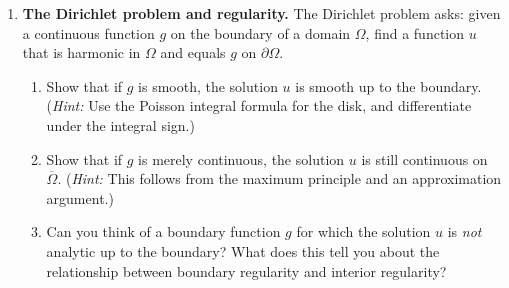 \begin{enumerate}
    \item[$\star$] \textbf{The Dirichlet problem and regularity.} The Dirichlet problem asks: given a continuous function $g$ on the boundary of a domain $\Omega$, find a function $u$ that is harmonic in $\Omega$ and equals $g$ on $\partial \Omega$.
    \begin{enumerate}
        \item Show that if $g$ is smooth, the solution $u$ is smooth up to the boundary. (\emph{Hint:} Use the Poisson integral formula for the disk, and differentiate under the integral sign.)
        \item Show that if $g$ is merely continuous, the solution $u$ is still continuous on $\overline{\Omega}$. (\emph{Hint:} This follows from the maximum principle and an approximation argument.)
        \item Can you think of a boundary function $g$ for which the solution $u$ is \emph{not} analytic up to the boundary? What does this tell you about the relationship between boundary regularity and interior regularity?
    \end{enumerate}

\end{enumerate}
